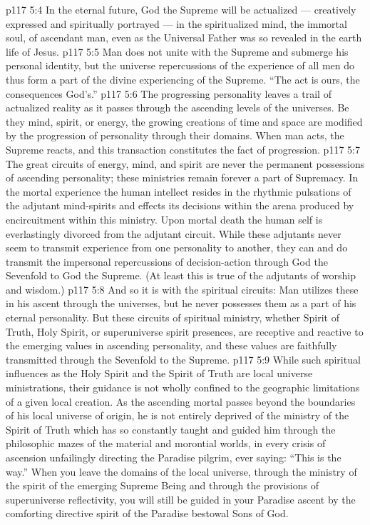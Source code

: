 \vs p117 5:4 In the eternal future, God the Supreme will be actualized --- creatively expressed and spiritually portrayed --- in the spiritualized mind, the immortal soul, of ascendant man, even as the Universal Father was so revealed in the earth life of Jesus.
\vs p117 5:5 \pc Man does not unite with the Supreme and submerge his personal identity, but the universe repercussions of the experience of all men do thus form a part of the divine experiencing of the Supreme. “The act is ours, the consequences God’s.”
\vs p117 5:6 The progressing personality leaves a trail of actualized reality as it passes through the ascending levels of the universes. Be they mind, spirit, or energy, the growing creations of time and space are modified by the progression of personality through their domains. When man acts, the Supreme reacts, and this transaction constitutes the fact of progression.
\vs p117 5:7 The great circuits of energy, mind, and spirit are never the permanent possessions of ascending personality; these ministries remain forever a part of Supremacy. In the mortal experience the human intellect resides in the rhythmic pulsations of the adjutant mind\hyp{}spirits and effects its decisions within the arena produced by encircuitment within this ministry. Upon mortal death the human self is everlastingly divorced from the adjutant circuit. While these adjutants never seem to transmit experience from one personality to another, they can and do transmit the impersonal repercussions of decision\hyp{}action through God the Sevenfold to God the Supreme. (At least this is true of the adjutants of worship and wisdom.)
\vs p117 5:8 And so it is with the spiritual circuits: Man utilizes these in his ascent through the universes, but he never possesses them as a part of his eternal personality. But these circuits of spiritual ministry, whether Spirit of Truth, Holy Spirit, or superuniverse spirit presences, are receptive and reactive to the emerging values in ascending personality, and these values are faithfully transmitted through the Sevenfold to the Supreme.
\vs p117 5:9 \pc While such spiritual influences as the Holy Spirit and the Spirit of Truth are local universe ministrations, their guidance is not wholly confined to the geographic limitations of a given local creation. As the ascending mortal passes beyond the boundaries of his local universe of origin, he is not entirely deprived of the ministry of the Spirit of Truth which has so constantly taught and guided him through the philosophic mazes of the material and morontial worlds, in every crisis of ascension unfailingly directing the Paradise pilgrim, ever saying: “This is the way.” When you leave the domains of the local universe, through the ministry of the spirit of the emerging Supreme Being and through the provisions of superuniverse reflectivity, you will still be guided in your Paradise ascent by the comforting directive spirit of the Paradise bestowal Sons of God.
